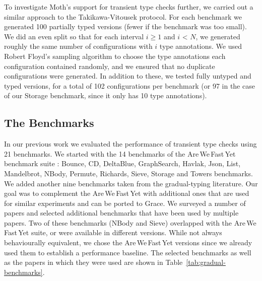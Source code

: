 \documentclass[sigplan,10pt,review,screen]{acmart}\settopmatter{printfolios=true}
\def\AWFY{Are\,We\,Fast\,Yet\xspace}
\begin{document}
To investigate Moth's support for transient type checks further, we carried out a similar approach to the Takikawa-Vitousek protocol. For each benchmark we generated 100 partially typed versions (fewer if the benchmark was too small). We did an even split so that for each interval $i \ge 1$ and $i$ < $N$, we generated roughly the same number of configurations with $i$ type annotations. We used Robert Floyd's sampling algorithm \cite{Bentley:1987:PPS:30401.315746} to choose the type annotations each configuration contained randomly, and we ensured that no duplicate configurations were generated. In addition to these, we tested fully untyped and typed versions, for a total of 102 configurations per benchmark (or 97 in the case of our Storage benchmark, since it only has 10 type annotations).

\subsection{The Benchmarks}
In our previous work \cite{roberts-and-co-ecoop-2019} we evaluated the performance of transient type checks using 21 benchmarks. We started with the 14 benchmarks of the \AWFY
benchmark suite \cite{Marr2016}: Bounce, CD, DeltaBlue, GraphSearch, Havlak, Json, List, Mandelbrot, NBody, Permute, Richards, Sieve, Storage and Towers benchmarks. We added another nine benchmarks taken from the gradual-typing literature.
Our goal was to complement the \AWFY with additional ones that are used for similar experiments and can be ported to Grace.
We surveyed a number of papers
\citep{Takikawa2016,Vitousek2017,Muehlboeck2017,Bauman2017,Richards2017,Stulova2016,Greenman2018}
and selected additional benchmarks that have been used by multiple papers.
Two of these benchmarks (NBody and Sieve) overlapped with the \AWFY suite,
or were available in different versions.
While not always behaviourally equivalent,
we chose the \AWFY versions since we already used them to
establish a performance baseline.
The selected benchmarks as well as the papers in which they were used are shown in
Table~\ref{tab:gradual-benchmarks}.
\end{document}

